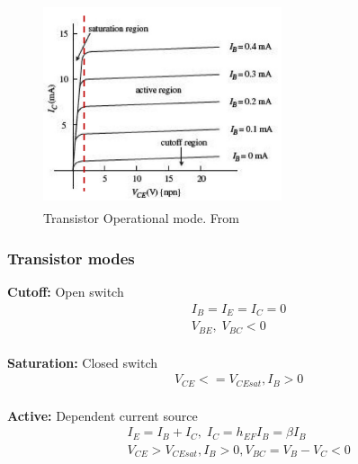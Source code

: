 \begin{figure}[h]
    \vspace{10mm}
    \centering
    \includegraphics[width=7cm, height=6cm]{image/transistor_operation-mode.png}
    \caption{Transistor Operational mode. From \cite{}}
\end{figure}


\newpage
\subsubsection{Transistor modes}
\noindent\textbf{Cutoff:}
Open switch
\begin{align*}
    &I_B = I_E = I_C = 0 \\
    &V_{BE}, \; V_{BC} < 0 \\
\end{align*}

\noindent\textbf{Saturation:}
Closed switch
\begin{align*}
    &V_{CE} <= V_{CEsat}, I_B>0 \\
\end{align*}

\noindent\textbf{Active:}
Dependent current source
\begin{align*}
    &I_E = I_B + I_C, \; I_C = h_{EF} I_B = \beta I_B \\
    &V_{CE} > V_{CEsat}, I_B>0, V_{BC} = V_B-V_C < 0 \\
\end{align*}


